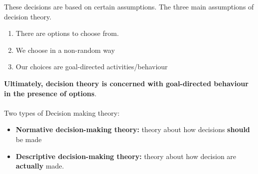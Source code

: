 \documentclass[12pt, a4paper]{article}
\begin{document}
These decisions are based on certain assumptions. The three main assumptions of 
decision theory.
\begin{enumerate}
    \item There are options to choose from.
    \item We choose in a non-random way
    \item Our choices are goal-directed activities/behaviour
\end{enumerate}

\textbf{Ultimately, decision theory is concerned with goal-directed behaviour in the
presence of options}.

\paragraph*{}
Two types of Decision making theory:
\begin{itemize}
    \item \textbf{Normative decision-making theory:} theory about how decisions \textbf{should} be made
    \item \textbf{Descriptive decision-making theory:} theory about how decision are \textbf{actually} made.
\end{itemize}
\end{document}
